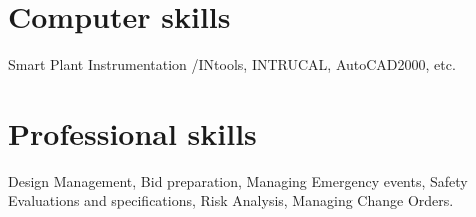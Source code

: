\documentclass{tccv}
\begin{document}
\section{Computer skills}

\begin{multiline}
   Smart Plant Instrumentation /INtools, INTRUCAL, AutoCAD2000, etc. 
\end{multiline}

\section{Professional skills}

\begin{multiline}
   Design Management, Bid preparation, Managing Emergency events, Safety Evaluations and specifications,  Risk Analysis, Managing Change Orders.
\end{multiline}
\end{document}

